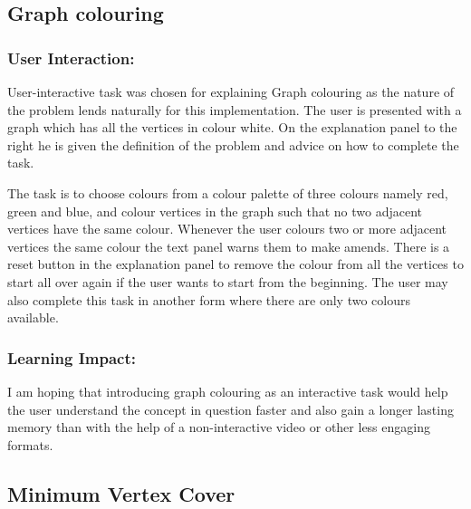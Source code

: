 \subsection{Graph colouring}
\label{story: coloring}
\subsubsection{User Interaction:}
User-interactive task was chosen for explaining Graph colouring as the nature
of the problem lends naturally for this implementation. The user is presented with a graph
which has all the vertices in colour white. On the explanation panel to the
right he is given the definition of the problem and advice on how to complete
the task.  

The task is to choose colours from a colour palette of three colours namely red,
green and blue, and colour vertices in the graph such that no two adjacent
vertices have the same colour. Whenever the user colours two or more adjacent
vertices the same colour the text panel warns them to make amends. There is a
reset button in the explanation panel to remove the colour from all the vertices to start all
over again if the user wants to start from the beginning. The user may also complete this task in another form where there are only two colours available.

\subsubsection{Learning Impact:}
I am hoping that introducing graph colouring as an interactive task would help the user understand the concept in question faster and also gain a longer lasting memory than with the help of a non-interactive video or other less engaging formats.

\subsection{Minimum Vertex Cover}
\label{story: vertexcover}
